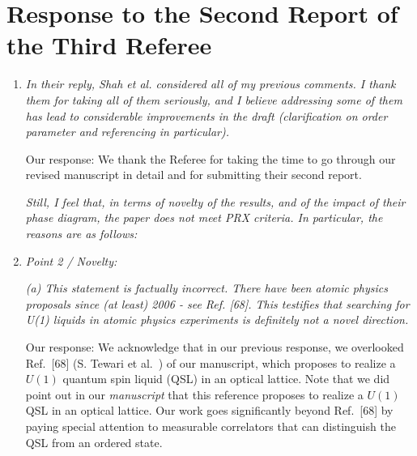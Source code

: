 \documentclass[
onecolumn,
superscriptaddress,
longbibliography,
nofootinbib,
 amsmath,amssymb,
 aps,
prb
]{revtex4-2}
\newcommand{\response}[1]{\textcolor{Mulberry}{#1}}
\begin{document}
\section{Response to the Second Report of the Third Referee}
\begin{enumerate}

\item \textit{In their reply, Shah et al. considered all of my previous comments. I
thank them for taking all of them seriously, and I believe addressing
some of them has lead to considerable improvements in the draft
(clarification on order parameter and referencing in particular).}

\response{Our response: We thank the Referee for taking the time to go through our revised manuscript in detail and for submitting their second report.}

\textit{Still, I feel that, in terms of novelty of the results, and of the
impact of their phase diagram, the paper does not meet PRX criteria.
In particular, the reasons are as follows:}

\item \textit{Point 2 / Novelty:}
    
\textit{(a) This statement is factually incorrect. There have been atomic
physics proposals since (at least) 2006 - see Ref. [68]. This
testifies that searching for U(1) liquids in atomic physics
experiments is definitely not a novel direction.
}

\response{Our response: We  acknowledge that in our previous response, we overlooked Ref.~[68] (S. Tewari et  al.~\cite{tewari2006emergence}) of our manuscript, which proposes to realize a $U(1)$ quantum spin liquid (QSL) in an optical lattice. 
Note that we did point out in our \textit{manuscript} that this reference proposes to realize a $U(1)$ QSL in an optical lattice.
Our work goes significantly beyond Ref.~[68] by paying special attention to measurable correlators that can distinguish the QSL from an ordered state.}


\end{enumerate}
\end{document}
